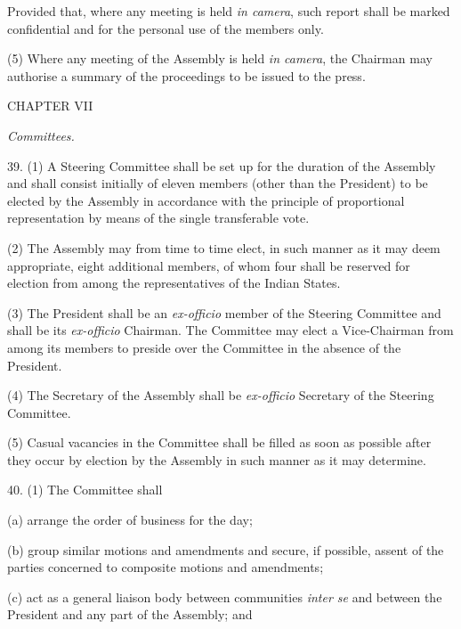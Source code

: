 Provided that, where any meeting is held \emph{in camera}, such report shall be marked confidential and for the personal use of the members only.



(5) Where any meeting of the Assembly is held \emph{in camera}, the Chairman may authorise a summary of the proceedings to be issued to the press.



\begin{center}
CHAPTER VII\end{center}
\begin{center}
\emph{Committees.}\end{center}


39. (1) A Steering Committee shall be set up for the duration of the Assembly and shall consist initially of eleven members (other than the President) to be elected by the Assembly in accordance with the principle of proportional representation by means of the single transferable vote.



(2) The Assembly may from time to time elect, in such manner as it may deem appropriate, eight additional members, of whom four shall be reserved for election from among the representatives of the Indian States.



(3) The President shall be an \emph{ex-officio} member of the Steering Committee and shall be its \emph{ex-officio} Chairman. The Committee may elect a Vice-Chairman from among its members to preside over the Committee in the absence of the President.



(4) The Secretary of the Assembly shall be \emph{ex-officio} Secretary of the Steering Committee.



(5) Casual vacancies in the Committee shall be filled as soon as possible after they occur by election by the Assembly in such manner as it may determine.



40. (1) The Committee shall\textemdash{}



(a) arrange the order of business for the day;

(b) group similar motions and amendments and secure, if possible, assent of the parties concerned to composite motions and amendments;

(c) act as a general liaison body between communities \emph{inter se} and between the President and any part of the Assembly; and

